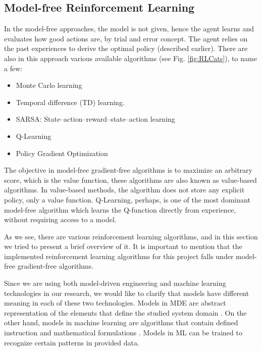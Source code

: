\documentclass[11pt,letterpaper]{ryersonSGSThesis}
\begin{document}
\begin{ryersonSGSThesis}
        \subsection{Model-free Reinforcement Learning}
            In the model-free approaches, the model is not given, hence the agent learns and evaluates how good actions are, by trial and error concept. The agent relies on the past experiences to derive the optimal policy (described earlier). There are also in this approach various available algorithms (see Fig. \ref{fig:RLCats}), to name a few:
            
            \begin{itemize}
                \item Monte Carlo learning
                \item Temporal difference (TD) learning.
                \item SARSA: State–action–reward–state–action learning
                \item Q-Learning
                \item Policy Gradient Optimization
            \end{itemize}
            
            The objective in model-free gradient-free algorithms is to maximize an arbitrary score, which is the value function, these algorithms are also known as value-based algorithms. In value-based methods, the algorithm does not store any explicit policy, only a value function.
            Q-Learning, perhaps, is one of the most dominant model-free algorithm which learns the Q-function directly from experience, without requiring access to a model.
            
            As we see, there are various reinforcement learning algorithms, and in this section we tried to present a brief overview of it. It is important to mention that the implemented reinforcement learning algorithms for this project falls under model-free gradient-free algorithms.
    
    Since we are using both model-driven engineering and machine learning technologies in our research, we would like to clarify that models have different meaning in each of these two technologies. Models in MDE are abstract representation of the elements that define the studied system domain \cite{Schmidt2006}. On the other hand, models in machine learning are algorithms that contain defined instruction and mathematical formulations \cite{Jiang2021}. Models in ML can be trained to recognize certain patterns in provided data.
    

\end{ryersonSGSThesis}
\end{document}
